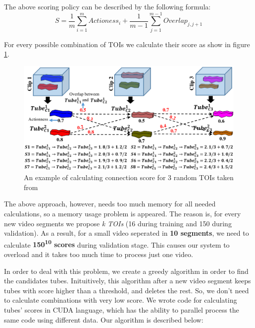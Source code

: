 \documentclass{report}
\begin{document}
The above scoring policy can be described by the following formula:
\[ S = \frac{1}{m} \sum_ {i=1}^{m} Actioness_i + \frac{1}{m-1} \sum_{j=1}^{m-1} Overlap_{j,j+1} \]

For every possible combination of TOIs we calculate their score as show in figure \ref{fig:connection_algo}.

\begin{figure}[h]
  \centering
  \includegraphics[scale=0.225]{connection_algo}
  \caption{An example of calculating connection score for 3 random TOIs taken from \cite{DBLP:journals/corr/HouCS17}}
  \label{fig:connection_algo}
\end{figure}

The above approach, however, needs too much memory for all needed calculations, so a memory usage  problem is
appeared. The reason is, for every new video segments we propose \textit{k TOIs} (16 during training and 150 during validation).
As a result, for a small video seperated in  \textbf{10 segments}, we need to calculate 
\textbf{  150\textsuperscript{10} scores} during validation stage. This causes our system to overload and it takes too much time to process
just one video. \par

In order to deal with this problem, we create a greedy algorithm in order to find the candidates tubes. Inituitively, this algorithm after
a new video segment keeps tubes with score higher than a threshold, and deletes the rest. So, we don't need to calculate combinations with
very low score. We wrote code for calculating tubes' scores in CUDA language, which has the ability to
parallel process the same code using different data. Our algorithm is described below:
\end{document}
